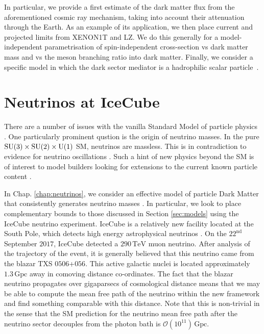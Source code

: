 In particular, we provide a first estimate of the dark matter flux from the aforementioned cosmic ray mechanism, taking into account their attenuation through the Earth. As an example of its application, we then place current and projected limits from XENON1T and LZ. We do this generally for a model-independent parametrisation of spin-independent cross-section vs dark matter mass and vs the meson branching ratio into dark matter. Finally, we consider a specific model in which the dark sector mediator is a hadrophilic scalar particle~\cite{Batell:2018fqo}.

\section{Neutrinos at IceCube}

There are a number of issues with the vanilla Standard Model of particle physics \cite{Bonnet2012, Farzan2011, Bednyakov2007, Kubo2006, Davidson2002, Ma2001, Yao2018}. One particularly prominent qustion is the origin of neutrino masses. In the pure $\rm{SU}(3) \times \rm{SU}(2) \times \rm{U}(1)$ SM, neutrinos are massless. This is in contradiction to evidence for neutrino oscillations \cite{Fukuda:1998mi}. Such a hint of new physics beyond the SM is of interest to model builders looking for extensions to the current known particle content \cite{Ma1998,Ma2001,Ma2006a}.

In Chap. \ref{chap:neutrinos}, we consider an effective model of particle Dark Matter that consistently generates neutrino masses \cite{Boehm,Farzan2009, Ma2006, Franarin2018, Farzan2010, Artamonov2016, Farzan2010a, Farzan2011, Ambrosino2009, Farzan2014, Ma2006a, Boehm2006, Serpico2004, Boehm2004, Boehm2003, Ma1998}. In particular, we look to place complementary bounds to those discussed in Section \ref{sec:models} using the IceCube neutrino experiment. IceCube is a relatively new facility located at the South Pole, which detects high energy astrophysical neutrinos \cite{Kelly, Padovani2018, IceCube, IceCube2018, Ackermann2018, Difranzo2015, Hooper2018, Ioka2014}. On the $22^{\textrm{nd}}$ September $2017$, IceCube detected a $290\,\textrm{TeV}$ muon neutrino. After analysis of the trajectory of the event, it is generally believed that this neutrino came from the blazar TXS $0506$+$056$. This active galactic nuclei is located approximately $1.3 \,\textrm{Gpc}$ away in comoving distance co-ordinates. The fact that the blazar neutrino propagates over gigaparsecs of cosmological distance means that we may be able to compute the mean free path of the neutrino within the new framework and find something comparable with this distance. Note that this is non-trivial in the sense that the SM prediction for the neutrino mean free path after the neutrino sector decouples from the photon bath is $\mathcal{O}(10^{11}) \, \textrm{Gpc}$.

